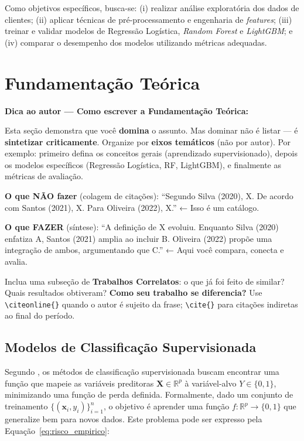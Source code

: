 \documentclass[
    article,
    12pt,
    oneside,
    a4paper,
    english,
    brazilian
    ]{abntex2}
\numberwithin{equation}{section}
\newenvironment{dica}{%
    \par\medskip
    \color{blue!60!black}\small\itshape
}{%
    \par\medskip
}
\begin{document}
Como objetivos específicos, busca-se: (i) realizar análise exploratória dos dados de clientes; (ii) aplicar técnicas de pré-processamento e engenharia de \textit{features}; (iii) treinar e validar modelos de Regressão Logística, \textit{Random Forest} e \textit{LightGBM}; e (iv) comparar o desempenho dos modelos utilizando métricas adequadas.

\section{Fundamentação Teórica}

\begin{dica}
\noindent\textbf{Dica ao autor — Como escrever a Fundamentação Teórica:}

Esta seção demonstra que você \textbf{domina} o assunto. Mas dominar não é listar --- é \textbf{sintetizar criticamente}. Organize por \textbf{eixos temáticos} (não por autor). Por exemplo: primeiro defina os conceitos gerais (aprendizado supervisionado), depois os modelos específicos (Regressão Logística, RF, LightGBM), e finalmente as métricas de avaliação.

\textbf{O que NÃO fazer} (colagem de citações): ``Segundo Silva (2020), X. De acordo com Santos (2021), X. Para Oliveira (2022), X.'' ← Isso é um catálogo.

\textbf{O que FAZER} (síntese): ``A definição de X evoluiu. Enquanto Silva (2020) enfatiza A, Santos (2021) amplia ao incluir B. Oliveira (2022) propõe uma integração de ambos, argumentando que C.'' ← Aqui você compara, conecta e avalia.

Inclua uma subseção de \textbf{Trabalhos Correlatos}: o que já foi feito de similar? Quais resultados obtiveram? \textbf{Como seu trabalho se diferencia?} Use \texttt{\textbackslash citeonline\{\}} quando o autor é sujeito da frase; \texttt{\textbackslash cite\{\}} para citações indiretas ao final do período.
\end{dica}

\subsection{Modelos de Classificação Supervisionada}

Segundo , os métodos de classificação supervisionada buscam encontrar uma função que mapeie as variáveis preditoras $\mathbf{X} \in \mathbb{R}^p$ à variável-alvo $Y \in \{0,1\}$, minimizando uma função de perda definida. Formalmente, dado um conjunto de treinamento $\{(\mathbf{x}_i, y_i)\}_{i=1}^n$, o objetivo é aprender uma função $f: \mathbb{R}^p \to \{0,1\}$ que generalize bem para novos dados. Este problema pode ser expresso pela Equação~\ref{eq:risco_empirico}:
\end{document}

